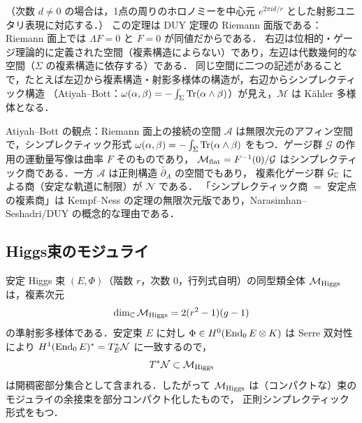 （次数 $d\neq0$ の場合は，1点の周りのホロノミーを中心元 $e^{2\pi i d/r}$ とした射影ユニタリ表現に対応する．）
この定理は DUY 定理の Riemann 面版である：Riemann 面上では $\Lambda F=0$ と $F=0$ が同値だからである．
右辺は位相的・ゲージ理論的に定義された空間（複素構造によらない）であり，左辺は代数幾何的な空間（$\Sigma$ の複素構造に依存する）である．
同じ空間に二つの記述があることで，たとえば左辺から複素構造・射影多様体の構造が，右辺からシンプレクティック構造
（Atiyah--Bott：$\omega(\alpha,\beta)=-\int_\Sigma\operatorname{Tr}(\alpha\wedge\beta)$）が見え，$\mathcal{M}$ は Kähler 多様体となる．

\begin{note}
Atiyah--Bott の観点：Riemann 面上の接続の空間 $\mathcal{A}$ は無限次元のアフィン空間で，シンプレクティック形式
$\omega(\alpha,\beta)=-\int_\Sigma\operatorname{Tr}(\alpha\wedge\beta)$ をもつ．ゲージ群 $\mathcal{G}$ の作用の運動量写像は曲率 $F$ そのものであり，
$\mathcal{M}_{\rm flat}=F^{-1}(0)/\mathcal{G}$ はシンプレクティック商である．一方 $\mathcal{A}$ は正則構造 $\bar\partial_A$ の空間でもあり，
複素化ゲージ群 $\mathcal{G}_{\mathbb{C}}$ による商（安定な軌道に制限）が $\mathcal{N}$ である．
「シンプレクティック商 $=$ 安定点の複素商」は Kempf--Ness の定理の無限次元版であり，Narasimhan--Seshadri/DUY の概念的な理由である．
\end{note}

\subsection{Higgs束のモジュライ}

安定 Higgs 束 $(E,\Phi)$（階数 $r$，次数 $0$，行列式自明）の同型類全体 $\mathcal{M}_{\rm Higgs}$ は，複素次元
\begin{equation}
  \dim_{\mathbb{C}}\mathcal{M}_{\rm Higgs} = 2(r^2-1)(g-1)
\end{equation}
の準射影多様体である．安定束 $E$ に対し $\Phi\in H^0(\operatorname{End}_0 E\otimes K)$ は Serre 双対性により $H^1(\operatorname{End}_0E)^* = T^*_E\mathcal{N}$ に一致するので，
\begin{equation}
  T^*\mathcal{N}\subset\mathcal{M}_{\rm Higgs}
\end{equation}
は開稠密部分集合として含まれる．したがって $\mathcal{M}_{\rm Higgs}$ は（コンパクトな）束のモジュライの余接束を部分コンパクト化したもので，
正則シンプレクティック形式をもつ．

